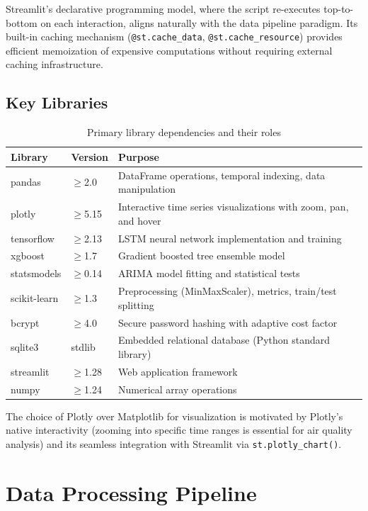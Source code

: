 Streamlit's declarative programming model, where the script re-executes top-to-bottom on each interaction, aligns naturally with the data pipeline paradigm. Its built-in caching mechanism (\texttt{@st.cache\_data}, \texttt{@st.cache\_resource}) provides efficient memoization of expensive computations without requiring external caching infrastructure.

\subsection{Key Libraries}

\begin{table}[h]
\centering
\begin{tabular}{|l|l|p{7cm}|}
\hline
\textbf{Library} & \textbf{Version} & \textbf{Purpose} \\
\hline
pandas & $\geq$2.0 & DataFrame operations, temporal indexing, data manipulation \\
\hline
plotly & $\geq$5.15 & Interactive time series visualizations with zoom, pan, and hover \\
\hline
tensorflow & $\geq$2.13 & LSTM neural network implementation and training \\
\hline
xgboost & $\geq$1.7 & Gradient boosted tree ensemble model \\
\hline
statsmodels & $\geq$0.14 & ARIMA model fitting and statistical tests \\
\hline
scikit-learn & $\geq$1.3 & Preprocessing (MinMaxScaler), metrics, train/test splitting \\
\hline
bcrypt & $\geq$4.0 & Secure password hashing with adaptive cost factor \\
\hline
sqlite3 & stdlib & Embedded relational database (Python standard library) \\
\hline
streamlit & $\geq$1.28 & Web application framework \\
\hline
numpy & $\geq$1.24 & Numerical array operations \\
\hline
\end{tabular}
\caption{Primary library dependencies and their roles}
\label{tab:libraries}
\end{table}

The choice of Plotly over Matplotlib for visualization is motivated by Plotly's native interactivity (zooming into specific time ranges is essential for air quality analysis) and its seamless integration with Streamlit via \texttt{st.plotly\_chart()}.


\section{Data Processing Pipeline}
\label{sec:datapipeline}

